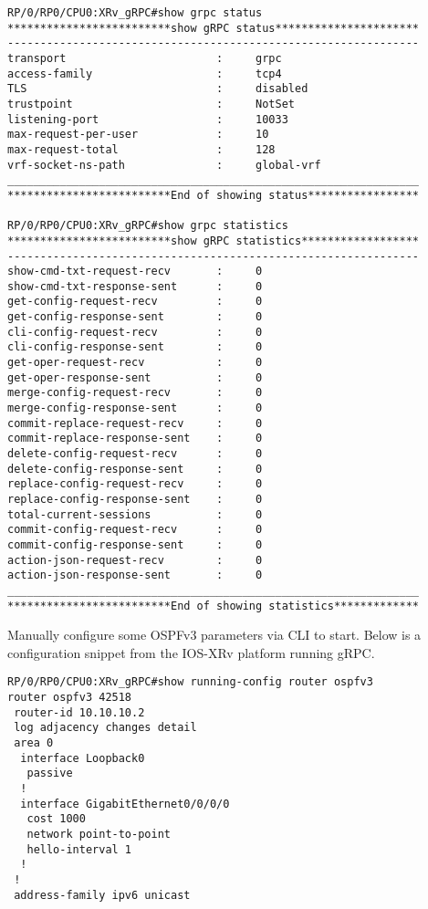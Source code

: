 \begin{verbatim}
RP/0/RP0/CPU0:XRv_gRPC#show grpc status
*************************show gRPC status**********************
---------------------------------------------------------------
transport                       :     grpc
access-family                   :     tcp4
TLS                             :     disabled
trustpoint                      :     NotSet
listening-port                  :     10033
max-request-per-user            :     10
max-request-total               :     128
vrf-socket-ns-path              :     global-vrf
_______________________________________________________________
*************************End of showing status*****************

RP/0/RP0/CPU0:XRv_gRPC#show grpc statistics 
*************************show gRPC statistics******************
---------------------------------------------------------------
show-cmd-txt-request-recv       :     0
show-cmd-txt-response-sent      :     0
get-config-request-recv         :     0
get-config-response-sent        :     0
cli-config-request-recv         :     0
cli-config-response-sent        :     0
get-oper-request-recv           :     0
get-oper-response-sent          :     0
merge-config-request-recv       :     0
merge-config-response-sent      :     0
commit-replace-request-recv     :     0
commit-replace-response-sent    :     0
delete-config-request-recv      :     0
delete-config-response-sent     :     0
replace-config-request-recv     :     0
replace-config-response-sent    :     0
total-current-sessions          :     0
commit-config-request-recv      :     0
commit-config-response-sent     :     0
action-json-request-recv        :     0
action-json-response-sent       :     0
_______________________________________________________________
*************************End of showing statistics*************
\end{verbatim}

Manually configure some OSPFv3 parameters via CLI to start. Below is a
configuration snippet from the IOS-XRv platform running gRPC.

\begin{verbatim}
RP/0/RP0/CPU0:XRv_gRPC#show running-config router ospfv3
router ospfv3 42518
 router-id 10.10.10.2
 log adjacency changes detail
 area 0
  interface Loopback0
   passive
  !
  interface GigabitEthernet0/0/0/0
   cost 1000
   network point-to-point
   hello-interval 1
  !
 !
 address-family ipv6 unicast
\end{verbatim}

